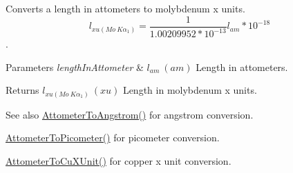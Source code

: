Converts a length in attometers to molybdenum x units. \[ l_{xu(Mo\ K\alpha_1)}=\frac{1}{1.00209952*10^{-13}} l_{am} * 10^{-18} \]. 


\begin{DoxyParams}{Parameters}
{\em length\+In\+Attometer} & $ l_{am}\ (am)$ Length in attometers. \\
\hline
\end{DoxyParams}
\begin{DoxyReturn}{Returns}
$ l_{xu(Mo\ K\alpha_1)}\ (xu)$ Length in molybdenum x units. 
\end{DoxyReturn}
\begin{DoxySeeAlso}{See also}
\mbox{\hyperlink{group___e_g_x_math-_conversions-_length_conversions-_s_i-_attometer-_non-_s_i_ga331ff6e8159f6f00bb7a20e39fa4d756}{Attometer\+To\+Angstrom()}} for angstrom conversion. 

\mbox{\hyperlink{group___e_g_x_math-_conversions-_length_conversions-_s_i-_attometer-_s_i_ga46ccf47b501bffeb16bc792377e55991}{Attometer\+To\+Picometer()}} for picometer conversion. 

\mbox{\hyperlink{group___e_g_x_math-_conversions-_length_conversions-_s_i-_attometer-_non-_s_i_gabd388c2e0821ac9066b4fb87e35402b1}{Attometer\+To\+Cu\+X\+Unit()}} for copper x unit conversion. 
\end{DoxySeeAlso}
